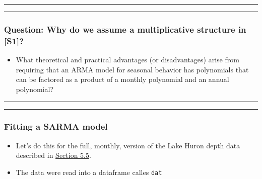 \documentclass[]{article}
\providecommand{\tightlist}{%
  \setlength{\itemsep}{0pt}\setlength{\parskip}{0pt}}
\begin{document}

\begin{center}\rule{0.5\linewidth}{\linethickness}\end{center}

\begin{center}\rule{0.5\linewidth}{\linethickness}\end{center}

\subsubsection{Question: Why do we assume a multiplicative structure in
{[}S1{]}?}\label{question-why-do-we-assume-a-multiplicative-structure-in-s1}


\begin{itemize}
\tightlist
\item
  What theoretical and practical advantages (or disadvantages) arise
  from requiring that an ARMA model for seasonal behavior has
  polynomials that can be factored as a product of a monthly polynomial
  and an annual polynomial?
\end{itemize}

\begin{center}\rule{0.5\linewidth}{\linethickness}\end{center}

\begin{center}\rule{0.5\linewidth}{\linethickness}\end{center}

\subsubsection{Fitting a SARMA model}\label{fitting-a-sarma-model}

\begin{itemize}
\item
  Let's do this for the full, monthly, version of the Lake Huron depth
  data described in
  \href{../05/notes05.html\#implementing-likelihood-based-inference-for-arma-models-in-r}{Section
  5.5}.
\item
  The data were read into a dataframe calles \texttt{dat}
\end{itemize}
\end{document}
